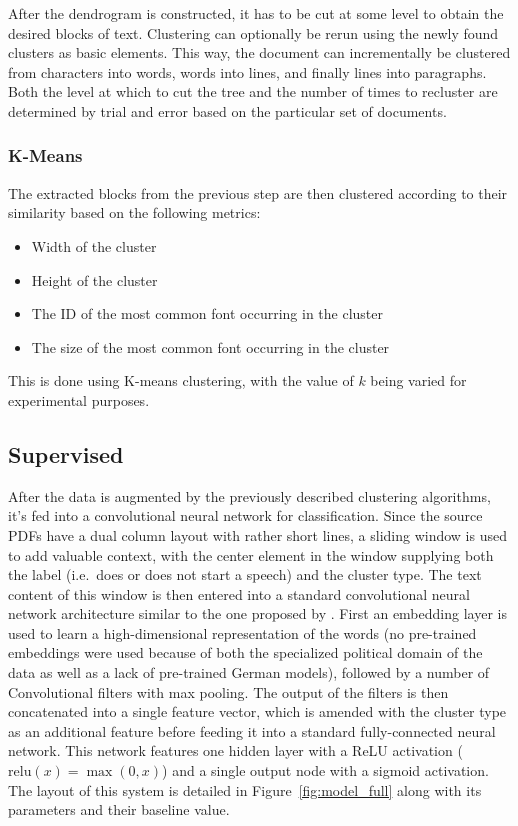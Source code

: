 After the dendrogram is constructed, it has to be cut at some level to obtain
the desired blocks of text. Clustering can optionally be rerun using the newly
found clusters as basic elements. This way, the document can incrementally be
clustered from characters into words, words into lines, and finally lines into
paragraphs. Both the level at which to cut the tree and the number of times to
recluster are determined by trial and error based on the particular set of
documents.

\subsubsection{K-Means}
The extracted blocks from the previous step are then clustered according to
their similarity based on the following metrics:
\begin{itemize}
  \item Width of the cluster
  \item Height of the cluster
  \item The ID of the most common font occurring in the cluster
  \item The size of the most common font occurring in the cluster
\end{itemize}
This is done using K-means clustering, with the value of $k$ being varied for
experimental purposes.

\subsection{Supervised}
\label{sec:sup}
After the data is augmented by the previously described clustering algorithms,
it's fed into a convolutional neural network for classification. Since the
source PDFs have a dual column layout with rather short lines, a sliding window
is used to add valuable context, with the center element in the window supplying
both the label (i.e.\ does or does not start a speech) and the cluster type. The
text content of this window is then entered into a standard convolutional neural
network architecture similar to the one proposed by \textcite{kim2014conv}.
First an embedding layer is used to learn a high-dimensional representation of
the words (no pre-trained embeddings were used because of both the specialized
political domain of the data as well as a lack of pre-trained German models),
followed by a number of Convolutional filters with max pooling. The output of
the filters is then concatenated into a single feature vector, which is amended
with the cluster type as an additional feature before feeding it into a standard
fully-connected neural network. This network features one hidden layer with a
ReLU activation ($\mathrm{relu}(x) = \max(0, x)$) and a single output node with a sigmoid
activation. The layout of this system is detailed in Figure~\ref{fig:model_full}
along with its parameters and their baseline value.

